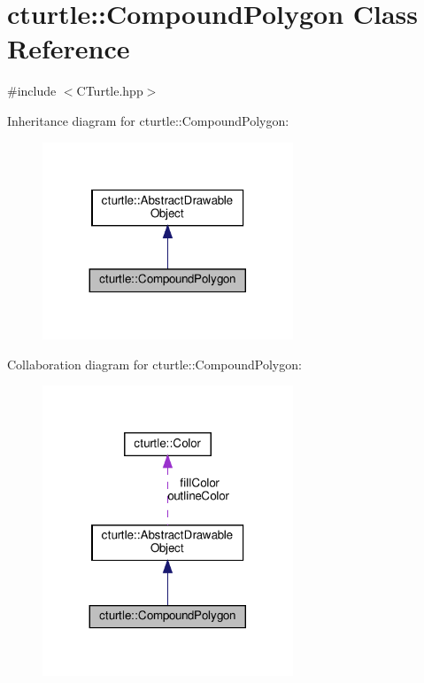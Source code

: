 \hypertarget{classcturtle_1_1CompoundPolygon}{}\section{cturtle\+:\+:Compound\+Polygon Class Reference}
\label{classcturtle_1_1CompoundPolygon}


{\ttfamily \#include $<$C\+Turtle.\+hpp$>$}



Inheritance diagram for cturtle\+:\+:Compound\+Polygon\+:\nopagebreak
\begin{figure}[H]
\begin{center}
\leavevmode
\includegraphics[width=212pt]{classcturtle_1_1CompoundPolygon__inherit__graph}
\end{center}
\end{figure}


Collaboration diagram for cturtle\+:\+:Compound\+Polygon\+:\nopagebreak
\begin{figure}[H]
\begin{center}
\leavevmode
\includegraphics[width=212pt]{classcturtle_1_1CompoundPolygon__coll__graph}
\end{center}
\end{figure}

